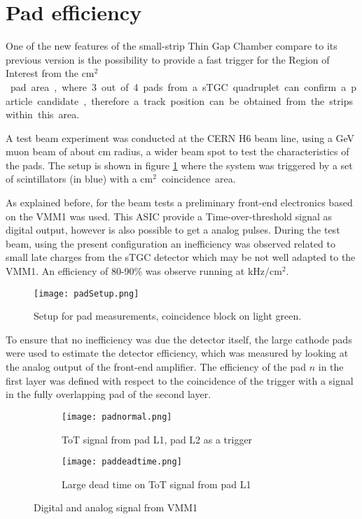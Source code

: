 \section{Pad efficiency}
One of the new features of the small-strip Thin Gap Chamber compare to its previous version is the possibility to provide
a fast trigger for the Region of Interest from the \unit[8x50]{cm$^2$} pad area, where 3 out of 4 pads from a sTGC
quadruplet can confirm a particle candidate, therefore a track position can be obtained from the strips within this
area.\par
A test beam experiment was conducted at the CERN H6 beam line, using a \unit[130]{GeV} muon beam of about
\unit[4]{cm}
radius, a wider beam spot to test the characteristics of the pads. The setup is shown in figure \ref{padsetup} where the system was
triggered by a set of scintillators (in blue) with a \unit[12x12]{cm$^2$} coincidence area.\par
As explained before, for the beam tests a preliminary front-end electronics based on the VMM1 was used. This ASIC
provide a Time-over-threshold signal as digital output, however is also possible to get a analog pulses.
During the test beam, using the present configuration an inefficiency was observed related to small late charges from
the sTGC detector which may be not well adapted to the VMM1. An efficiency of 80-90\% was observe running at
\unit[100]{kHz/cm$^2$}.\par


\begin{figure}[ht]
\centering
\texttt{[image: padSetup.png]}
\caption{Setup for pad measurements, coincidence block on light green.}\label{padsetup}
\end{figure}


To ensure that no inefficiency was due the detector itself, the large cathode pads were used to estimate the detector
efficiency, which was measured by looking at the analog output of the front-end amplifier. The efficiency of the pad $n$
in the first layer was defined with respect to the coincidence of the trigger with a signal in the fully overlapping pad
of the second layer. \par



\begin{figure}[ht]
\centering
\hspace*{\fill}
\begin{subfigure}[b]{0.45\textwidth}
\centering
\texttt{[image: padnormal.png]}
\caption{ToT signal from pad L1, pad L2 as a trigger}\label{scope1}
\end{subfigure}
\hfill
\begin{subfigure}[b]{0.45\textwidth}
\centering
\texttt{[image: paddeadtime.png]}
\caption{Large dead time on ToT signal from pad L1}\label{scope2}
\end{subfigure}
\hspace*{\fill}
\caption{Digital and analog signal from VMM1}\label{scope}
\end{figure}

